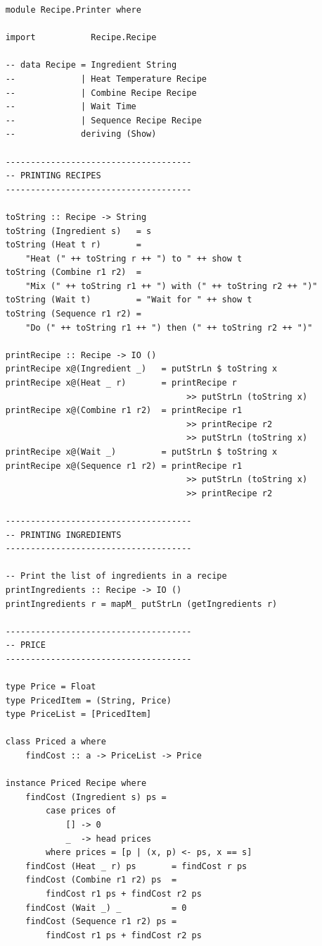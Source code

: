 \documentclass[11pt]{article}
\begin{document}
    \begin{tt}
    \small
    \begin{lstlisting}
    module Recipe.Printer where
    
    import           Recipe.Recipe
    
    -- data Recipe = Ingredient String
    --             | Heat Temperature Recipe
    --             | Combine Recipe Recipe
    --             | Wait Time
    --             | Sequence Recipe Recipe
    --             deriving (Show)
    
    -------------------------------------
    -- PRINTING RECIPES
    -------------------------------------
    
    toString :: Recipe -> String
    toString (Ingredient s)   = s
    toString (Heat t r)       =
        "Heat (" ++ toString r ++ ") to " ++ show t
    toString (Combine r1 r2)  =
        "Mix (" ++ toString r1 ++ ") with (" ++ toString r2 ++ ")"
    toString (Wait t)         = "Wait for " ++ show t
    toString (Sequence r1 r2) =
        "Do (" ++ toString r1 ++ ") then (" ++ toString r2 ++ ")"
    
    printRecipe :: Recipe -> IO ()
    printRecipe x@(Ingredient _)   = putStrLn $ toString x
    printRecipe x@(Heat _ r)       = printRecipe r
                                        >> putStrLn (toString x)
    printRecipe x@(Combine r1 r2)  = printRecipe r1
                                        >> printRecipe r2
                                        >> putStrLn (toString x)
    printRecipe x@(Wait _)         = putStrLn $ toString x
    printRecipe x@(Sequence r1 r2) = printRecipe r1
                                        >> putStrLn (toString x)
                                        >> printRecipe r2
    
    -------------------------------------
    -- PRINTING INGREDIENTS
    -------------------------------------
    
    -- Print the list of ingredients in a recipe
    printIngredients :: Recipe -> IO ()
    printIngredients r = mapM_ putStrLn (getIngredients r)
    
    -------------------------------------
    -- PRICE
    -------------------------------------
    
    type Price = Float
    type PricedItem = (String, Price)
    type PriceList = [PricedItem]
    
    class Priced a where
        findCost :: a -> PriceList -> Price
    
    instance Priced Recipe where
        findCost (Ingredient s) ps =
            case prices of
                [] -> 0
                _  -> head prices
            where prices = [p | (x, p) <- ps, x == s]
        findCost (Heat _ r) ps       = findCost r ps
        findCost (Combine r1 r2) ps  =
            findCost r1 ps + findCost r2 ps
        findCost (Wait _) _          = 0
        findCost (Sequence r1 r2) ps =
            findCost r1 ps + findCost r2 ps
    

\end{lstlisting}
\end{tt}
\end{document}
